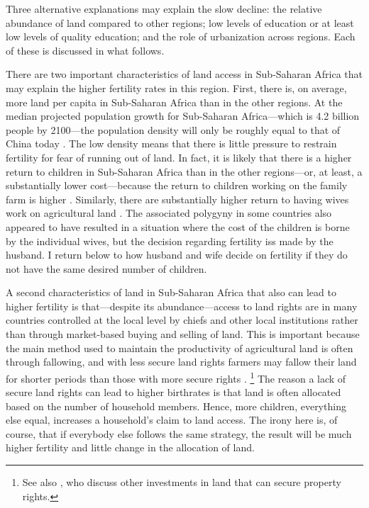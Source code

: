 \documentclass[letterpaper,12pt]{article}
\begin{document}
Three alternative explanations may explain the slow decline: the
relative abundance of land compared to other regions; low levels of
education or at least low levels of quality education; and the role of
urbanization across regions. 
Each of these is discussed in what follows.

There are two important characteristics of land access in Sub-Saharan
Africa that may explain the higher fertility rates in this region. 
First, there is, on average, more land per capita in Sub-Saharan Africa
than in the other regions. 
At the median projected population growth for Sub-Saharan Africa---which
is 4.2 billion people by 2100---the population density will only be
roughly equal to that of China today \citep[p 235]{Gerland2014}. 
The low density means that there is little pressure to restrain
fertility for fear of running out of land. 
In fact, it is likely that there is a higher return to children in
Sub-Saharan Africa than in the other regions---or, at least, a
substantially lower cost---because the return to children working on the
family farm is higher \citep{Caldwell1992,Bongaarts2013a}. 
Similarly, there are substantially higher return to having wives work on
agricultural land \citep{jacoby95,Matz2016}. 
The associated polygyny in some countries also appeared to have resulted
in a situation where the cost of the children is borne by the individual
wives, but the decision regarding fertility iss made by the husband. 
I return below to how husband and wife decide on fertility if they do
not have the same desired number of children.

A second characteristics of land in Sub-Saharan Africa that also can
lead to higher fertility is that---despite its abundance---access to
land rights are in many countries controlled at the local level by
chiefs and other local institutions rather than through market-based
buying and selling of land. 
This is important because the main method used to maintain the
productivity of agricultural land is often through fallowing, and with
less secure land rights farmers may fallow their land for shorter
periods than those with more secure rights \citep{Goldstein2008}.%
\footnote{
See also \citet{besley95c}, who discuss other investments in land that
can secure property rights.} 
The reason a lack of secure land rights can lead to higher birthrates is
that land is often allocated based on the number of household members. 
Hence, more children, everything else equal, increases a household's
claim to land access. 
The irony here is, of course, that if everybody else follows the same
strategy, the result will be much higher fertility and little change in
the allocation of land.
\end{document}
